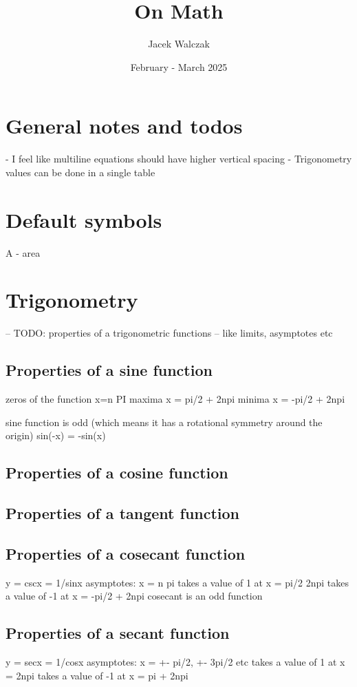 \documentclass{article}
\title{On Math}
\author{Jacek Walczak}
\date{February - March 2025}
\begin{document}
\maketitle

\section{General notes and todos}
- I feel like multiline equations should have higher vertical spacing
- Trigonometry values can be done in a single table

\section{Default symbols}

A - area

\section{Trigonometry}
-- TODO: properties of a trigonometric functions
-- like limits, asymptotes etc
\subsection{Properties of a sine function}
zeros of the function
x=n PI
maxima
x = pi/2 + 2npi
minima
x = -pi/2 + 2npi

sine function is odd (which means it has a rotational symmetry around the origin)
sin(-x) = -sin(x)

\subsection{Properties of a cosine function}
\subsection{Properties of a tangent function}
\subsection{Properties of a cosecant function}
y = cscx = 1/sinx
asymptotes: x = n pi
takes a value of 1 at x = pi/2 2npi
takes a value of -1 at x = -pi/2 + 2npi
cosecant is an odd function
\subsection{Properties of a secant function}
y = secx = 1/cosx
asymptotes: x = +- pi/2, +- 3pi/2 etc
takes a value of 1 at x = 2npi
takes a value of -1 at x = pi + 2npi
\end{document}
